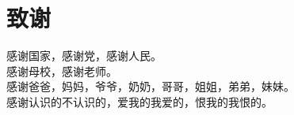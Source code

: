 \section*{致谢}

感谢国家，感谢党，感谢人民。
\\ \indent 感谢母校，感谢老师。
\\ \indent 感谢爸爸，妈妈，爷爷，奶奶，哥哥，姐姐，弟弟，妹妹。
\\ \indent 感谢认识的不认识的，爱我的我爱的，恨我的我恨的。